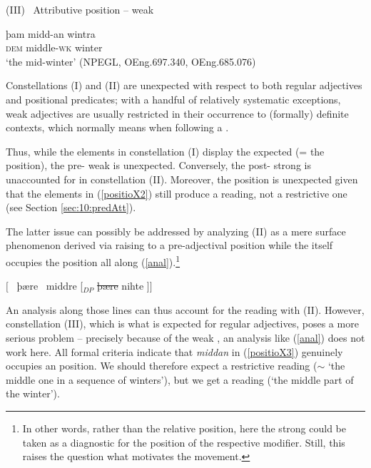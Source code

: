 \documentclass[output=paper,colorlinks,citecolor=brown]{langscibook}
\begin{document}

\noindent  (III)  \  Attributive position -- weak   
\begin{exe}
   \ex \label{positioX3}  
      \gll þam midd-an wintra \\ 
        \textsc{dem} middle-\textsc{wk}  winter   \\ 
      \glt `the mid-winter' (NPEGL, OEng.697.340, OEng.685.076) 
\end{exe} 

Constellations (I) and (II) are unexpected with respect to both regular adjectives and positional predicates; with a handful of relatively systematic exceptions, weak adjectives are usually restricted  in their occurrence to (formally) definite contexts, which normally means when following a .  

Thus, while the elements  in constellation (I) display the expected   (= the  position), the pre- weak  is unexpected. Conversely, the post- strong  is unaccounted for in constellation  (II). Moreover,  the  position is unexpected given that the elements in (\ref{positioX2}) still produce a  reading, not a restrictive one (see Section \ref{sec:10:predAtt}).

The latter  issue can possibly be addressed by analyzing (II) as a mere surface phenomenon derived via  raising to a pre-adjectival position while the  itself  occupies the  position all along (\ref{anal}).\footnote{In other words, rather than the relative  position, here the strong  could be taken as a diagnostic for  the  position of the respective modifier. %
Still, this raises the question what motivates the  movement.   }

\begin{exe}
   \ex \label{anal}  $[$ \  þære \  middre  [$_{DP}$  \sout{\color{gray}þære}  nihte  ]$]$
\end{exe}

An analysis along those lines can thus account for the  reading with (II). However, constellation (III), which is  what is expected for regular adjectives, poses a more serious problem -- precisely because of the weak , an analysis like (\ref{anal}) does not work here. All formal criteria indicate that  \textit{middan} in (\ref{positioX3}) genuinely occupies an  position. We should therefore expect a restrictive reading ($\sim$ `the middle one in a sequence of winters'), but we get a  reading (`the middle part of the winter'). 
\end{document}
